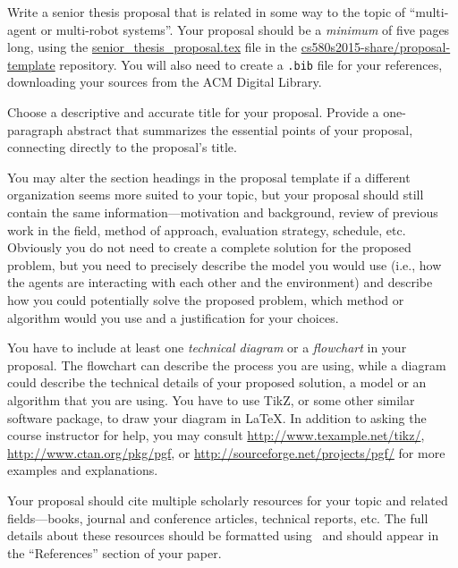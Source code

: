

\usepackage{ulem}
\usepackage[compact]{titlesec}




Write a senior thesis proposal that is related in some way to the topic of ``multi-agent or multi-robot systems''. Your
proposal should be a {\em minimum} of five pages long, using the \url{senior_thesis_proposal.tex} file in the
\url{cs580s2015-share/proposal-template} repository.  You will also need to create a {\tt .bib} file for
your references, downloading your sources from the ACM Digital Library.

Choose a descriptive and accurate title for your proposal. Provide a one-paragraph abstract that summarizes the
essential points of your proposal, connecting directly to the proposal's title.

You may alter the section headings in the proposal template if a different organization seems more suited to your topic,
but your proposal should still contain the same information---motivation and background, review of previous work in the
field, method of approach, evaluation strategy, schedule, etc. Obviously you do not need to create a complete solution
for the proposed problem, but you need to precisely describe the model you would use (i.e., how the agents are
interacting with each other and the environment) and describe how you could potentially solve the proposed problem,
which method or algorithm would you use and a justification for your choices.

You have to include at least one {\em technical diagram} or a {\em flowchart} in your proposal. The flowchart can
describe the process you are using, while a diagram could describe the technical details of your proposed solution, a
model or an algorithm that you are using. You have to use TikZ, or some other similar software package, to draw your
diagram in \LaTeX. In addition to asking the course instructor for help, you may consult
\url{http://www.texample.net/tikz/}, \url{http://www.ctan.org/pkg/pgf}, or \url{http://sourceforge.net/projects/pgf/}
for more examples and explanations.

Your proposal should cite multiple scholarly resources for your topic and related fields---books, journal and conference
articles, technical reports, etc. The full details about these resources should be formatted using \BibTeX\ and should
appear in the ``References'' section of your paper.

